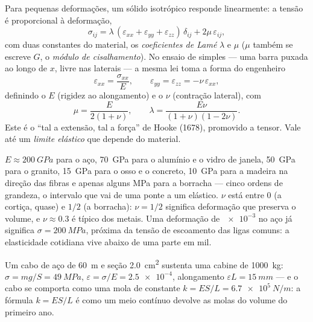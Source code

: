 \begin{theorem}\label{thm:b3:continuum-elasticity:hooke}
Para pequenas deformações, um sólido isotrópico responde linearmente: a
tensão é proporcional à deformação,
\[
\sigma_{ij} = \lambda\,(\varepsilon_{xx} + \varepsilon_{yy} +
\varepsilon_{zz})\,\delta_{ij} + 2\mu\,\varepsilon_{ij} ,
\]
com duas constantes do material, os \emph{coeficientes de Lamé}
$\lambda$ e $\mu$ ($\mu$ também se escreve $G$, o \emph{módulo de
cisalhamento}). No ensaio de  simples --- uma barra puxada ao
longo de $x$, livre nas laterais --- a mesma lei toma a forma do
engenheiro
\[
\varepsilon_{xx} = \frac{\sigma_{xx}}{E} , \qquad
\varepsilon_{yy} = \varepsilon_{zz} = -\nu\,\varepsilon_{xx} ,
\]
definindo o \emph{} $E$ (rigidez ao alongamento) e o
\emph{} $\nu$ (contração lateral), com
\[
\mu = \frac{E}{2(1 + \nu)} , \qquad
\lambda = \frac{E\nu}{(1 + \nu)(1 - 2\nu)} .
\]
Este é o ``tal a extensão, tal a força'' de Hooke (1678), promovido a
tensor. Vale até um \emph{limite elástico} que depende do material.
\end{theorem}
\admitted

\begin{remark}\label{rem:b3:continuum-elasticity:orders}
$E \approx \qty{200}{GPa}$ para o aço, \qty{70}{GPa} para o alumínio e
o vidro de janela, \qty{50}{GPa} para o granito, \qty{15}{GPa} para o
osso e o concreto, \qty{10}{GPa} para a madeira na direção das fibras
e apenas alguns MPa para a borracha --- cinco ordens de grandeza, o
intervalo que vai de uma ponte a um elástico. $\nu$ está entre $0$ (a
cortiça, quase) e $1/2$ (a borracha): $\nu = 1/2$ significa deformação
que preserva o volume, e $\nu \approx 0.3$ é típico dos metais. Uma
deformação de $\num{e-3}$ no aço já significa
$\sigma = \qty{200}{MPa}$, próxima da tensão de escoamento das ligas
comuns: a elasticidade cotidiana vive abaixo de uma parte em mil.
\end{remark}

\begin{example}\label{ex:b3:continuum-elasticity:cable}
Um cabo de aço de \qty{60}{m} e seção \qty{2.0}{cm^2} sustenta uma
cabine de \qty{1000}{kg}: $\sigma = mg/S = \qty{49}{MPa}$, $\varepsilon =
\sigma/E = \num{2.5e-4}$, alongamento $\varepsilon L = \qty{15}{mm}$
--- e o cabo se comporta como uma mola de constante $k = ES/L =
\qty{6.7e5}{N/m}$: a fórmula $k = ES/L$ é como um meio contínuo
devolve as molas do volume do primeiro ano.
\end{example}

